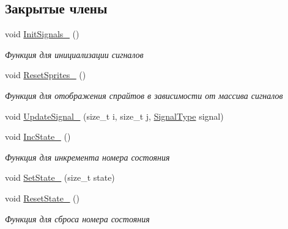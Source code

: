 \subsection*{Закрытые члены}
\begin{DoxyCompactItemize}
\item 
\mbox{\label{classrtm_1_1_control_unit_aeec72cf989ee126e9fb7a7b27c486f6b}} 
void \hyperlink{classrtm_1_1_control_unit_aeec72cf989ee126e9fb7a7b27c486f6b}{Init\+Signals\+\_\+} ()
\begin{DoxyCompactList}\small\item\em Функция для инициализации сигналов \end{DoxyCompactList}\item 
\mbox{\label{classrtm_1_1_control_unit_aca3d0de2c18e1b9fa1ca449e86328599}} 
void \hyperlink{classrtm_1_1_control_unit_aca3d0de2c18e1b9fa1ca449e86328599}{Reset\+Sprites\+\_\+} ()
\begin{DoxyCompactList}\small\item\em Функция для отображения спрайтов в зависимости от массива сигналов \end{DoxyCompactList}\item 
void \hyperlink{classrtm_1_1_control_unit_afacb521a6f7297b932a48edbbf0a10b2}{Update\+Signal\+\_\+} (size\+\_\+t i, size\+\_\+t j, \hyperlink{namespacertm_aadb7300c15d57429546fb0b7f8ee0ee6}{Signal\+Type} signal)
\item 
\mbox{\label{classrtm_1_1_control_unit_a63302a181e4f6cf8ecfc9acd24acfdb9}} 
void \hyperlink{classrtm_1_1_control_unit_a63302a181e4f6cf8ecfc9acd24acfdb9}{Inc\+State\+\_\+} ()
\begin{DoxyCompactList}\small\item\em Функция для инкремента номера состояния \end{DoxyCompactList}\item 
void \hyperlink{classrtm_1_1_control_unit_adc15ad500c2e7edbe9bdac16a16a0eff}{Set\+State\+\_\+} (size\+\_\+t state)
\item 
\mbox{\label{classrtm_1_1_control_unit_a8beeca4f58525c029a5879534304367e}} 
void \hyperlink{classrtm_1_1_control_unit_a8beeca4f58525c029a5879534304367e}{Reset\+State\+\_\+} ()
\begin{DoxyCompactList}\small\item\em Функция для сброса номера состояния \end{DoxyCompactList}\end{DoxyCompactItemize}
